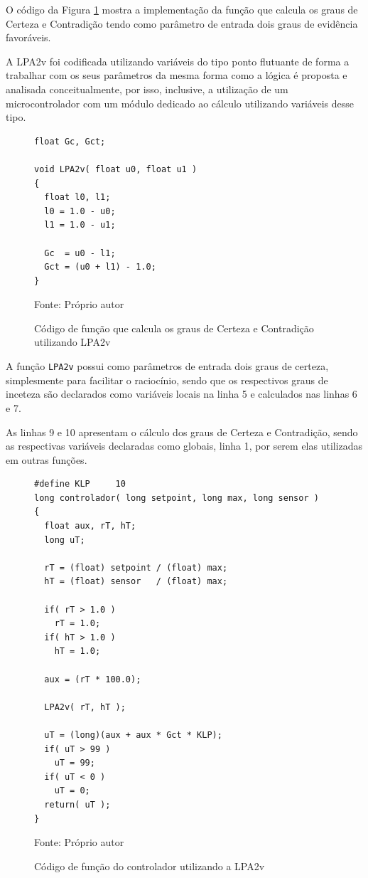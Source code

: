 O código da Figura \ref{fig:codigoGcGct} mostra 
a implementação da função que calcula os graus de Certeza e Contradição 
tendo como parâmetro de entrada dois graus de evidência favoráveis.

A LPA2v foi codificada utilizando variáveis do tipo ponto flutuante 
de forma a trabalhar com os seus parâmetros da mesma forma como a lógica é 
proposta e analisada conceitualmente, por isso, inclusive, 
a utilização de um microcontrolador com um módulo dedicado 
ao cálculo utilizando variáveis desse tipo. 


\begin{figure}[!htb]
\centering
\caption{Código de função que calcula os graus de Certeza e Contradição utilizando LPA2v}
\begin{minipage}{0.9\linewidth}
\begin{lstlisting}
float Gc, Gct;

void LPA2v( float u0, float u1 )
{
  float l0, l1;
  l0 = 1.0 - u0;
  l1 = 1.0 - u1;

  Gc  = u0 - l1;
  Gct = (u0 + l1) - 1.0;
}
\end{lstlisting}
\end{minipage}
\label{fig:codigoGcGct}

{\small Fonte: Próprio autor}
\end{figure}

A função \texttt{LPA2v} possui como parâmetros de entrada 
dois graus de certeza, simplesmente para facilitar o raciocínio,
sendo que os respectivos graus de inceteza 
são declarados como variáveis locais na linha 5 e calculados nas linhas 6 e 7.

As linhas 9 e 10 apresentam o cálculo dos graus de Certeza e Contradição, 
sendo as respectivas variáveis declaradas como globais, linha 1, 
por serem elas utilizadas em outras funções.






\begin{figure}[!htb]
\centering
\caption{Código de função do controlador utilizando a LPA2v}
\begin{minipage}{0.9\linewidth}
\lstset{firstnumber=12}
\begin{lstlisting}
#define KLP 	10
long controlador( long setpoint, long max, long sensor )
{
  float aux, rT, hT;
  long uT;

  rT = (float) setpoint / (float) max;
  hT = (float) sensor   / (float) max;

  if( rT > 1.0 )
    rT = 1.0;
  if( hT > 1.0 )
    hT = 1.0;
  
  aux = (rT * 100.0);

  LPA2v( rT, hT );
  
  uT = (long)(aux + aux * Gct * KLP);
  if( uT > 99 )
    uT = 99;
  if( uT < 0 ) 
    uT = 0;
  return( uT );
}

\end{lstlisting}
\end{minipage}
\label{fig:codigoControladorLPA2v}

{\small Fonte: Próprio autor}
\end{figure}






